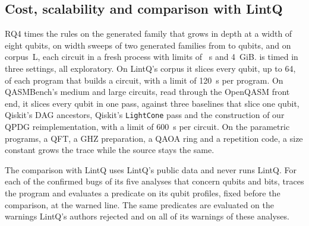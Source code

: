 \subsection{Cost, scalability and comparison with LintQ}
RQ4 times the rules on the generated family that grows in depth at a width of eight qubits, on width sweeps of two
generated families from \numSubjSweepMinQubits{} to \numSubjSweepMaxQubits{} qubits, and on corpus~L, each circuit in a fresh process with limits of \numCostWallLimit{}~s and 4~GiB. \tool{} is timed in
three settings, all exploratory. On LintQ's corpus it slices every qubit, up to 64, of each program that builds a
circuit, with a limit of 120~s per program. On QASMBench's medium and large circuits, read through the OpenQASM front
end, it slices every qubit in one pass, against three baselines that slice one qubit, Qiskit's DAG ancestors,
Qiskit's \texttt{LightCone} pass and the construction of our QPDG reimplementation, with a limit of 600~s per circuit.
On the parametric programs, a QFT, a GHZ preparation, a QAOA ring and a repetition code, a size constant grows the
trace while the source stays the same.

The comparison with LintQ uses LintQ's public data and never runs LintQ. For each of the \numLqQubitTp{} confirmed bugs
of its five analyses that concern qubits and bits, \tool{} traces the program and evaluates a predicate on its qubit
profiles, fixed before the comparison, at the warned line. The same predicates are evaluated on the warnings LintQ's
authors rejected and on all of its warnings of these analyses.
